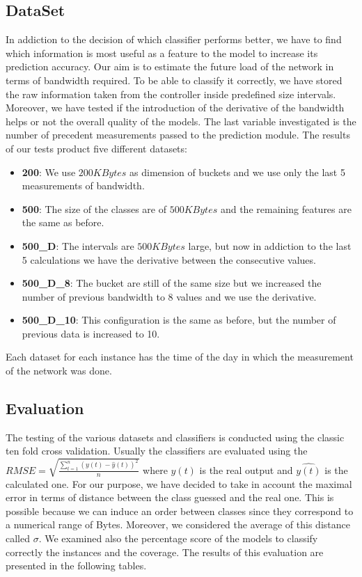 \documentclass[12pt]{article}
\begin{document}
\subsection{DataSet}
In addiction to the decision of which classifier performs better, we have to find which information is most useful as a feature to the model to increase its prediction accuracy.
Our aim is to estimate the future load of the network in terms of bandwidth required. 
To be able to classify it correctly, we have stored the raw information taken from the controller inside predefined size intervals. 
Moreover, we have tested if the introduction of the derivative of the bandwidth helps or not the overall quality of the models.
The last variable investigated is the number of precedent measurements passed to the prediction module.
The results of our tests product five different datasets:
\begin{itemize}
	\item \textbf{200}: We use $200 KBytes$ as dimension of buckets and we use only the last 5 measurements of bandwidth.
	
	\item \textbf{500}: The size of the classes are of $500 KBytes$ and the remaining features are the same as before.
	
	\item \textbf{500\_D}: The intervals are $500 KBytes$ large, but now in addiction to the last 5 calculations we have the derivative between the consecutive values.

	\item \textbf{500\_D\_8}: The bucket are still of the same size but we increased the number of previous bandwidth to 8 values and we use the derivative.
	\item \textbf{500\_D\_10}: This configuration is the same as before, but the number of previous data is increased to 10.
\end{itemize}
Each dataset for each instance has the time of the day in which the measurement of the network was done.

\subsection{Evaluation}
The testing of the various datasets and classifiers is conducted using the classic ten fold cross validation.
Usually the classifiers are evaluated using the $RMSE = \sqrt{ \frac{ \sum_{t=1}^{n} (y(t) - \hat{y}(t))^2  }{n}  }$ where $y(t)$ is the real output and $\hat{y(t)}$ is the calculated one.
For our purpose, we have decided to take in account the maximal error in terms of distance between the class guessed and the real one.
This is possible because we can induce an order between classes since they correspond to a numerical range of Bytes. 
Moreover, we considered the average of this distance called $\sigma$.
We examined also the percentage score of the models to classify correctly the instances and the coverage.
The results of this evaluation are presented in the following tables.
\end{document}
